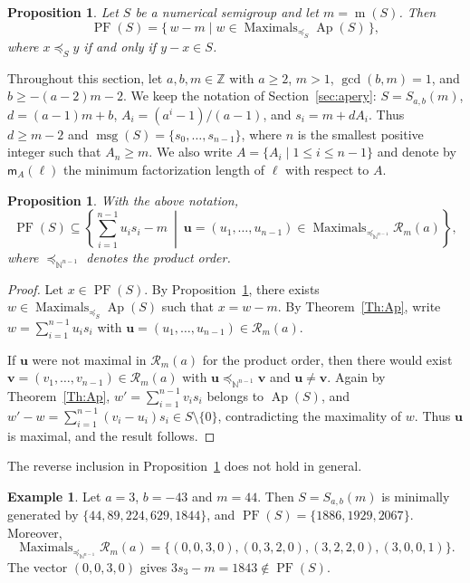\documentclass[12pt,a4paper]{amsart}
\newtheorem{proposition}[theorem]{Proposition}
\theoremstyle{definition}
\newtheorem{example}[theorem]{Example}
\begin{document}
\begin{proposition}\label{prop:PF1}
Let $S$ be a numerical semigroup and let $m=\operatorname{m}(S)$. Then
\[
\operatorname{PF}(S)=
\{\,w-m \mid w\in \operatorname{Maximals}_{\preceq_S}\operatorname{Ap}(S)\,\},
\]
where $x\preceq_S y$ if and only if $y-x\in S$.
\end{proposition}

Throughout this section, let $a,b,m\in\mathbb{Z}$ with $a\ge 2$,
$m>1$, $\gcd(b,m)=1$, and $b\ge -(a-2)m-2$. We keep the notation of
Section~\ref{sec:apery}: $S=S_{a,b}(m)$,
$d=(a-1)m+b$, $A_i=(a^i-1)/(a-1)$, and $s_i=m+dA_i$. Thus
$d\ge m-2$ and
$\operatorname{msg}(S)=\{s_0,\ldots,s_{n-1}\}$, where $n$ is the
smallest positive integer such that $A_n\ge m$. We also write
$A=\{A_i\mid 1\le i\le n-1\}$ and denote by $\mathsf{m}_A(\ell)$ the
minimum factorization length of $\ell$ with respect to $A$.

\begin{proposition}\label{prop:PF2}
With the above notation,
\[
\operatorname{PF}(S) \subseteq
\left\{\sum_{i=1}^{n-1} u_i s_i - m\ \middle|\ 
\mathbf{u}=(u_1,\ldots,u_{n-1}) \in
\operatorname{Maximals}_{\preceq_{\mathbb{N}^{n-1}}}\mathcal{R}_m(a)
\right\},
\]
where $\preceq_{\mathbb{N}^{n-1}}$ denotes the product order.
\end{proposition}

\begin{proof}
Let $x\in\operatorname{PF}(S)$. By Proposition~\ref{prop:PF1}, there
exists $w\in \operatorname{Maximals}_{\preceq_S}\operatorname{Ap}(S)$
such that $x=w-m$. By Theorem~\ref{Th:Ap}, write
$w=\sum_{i=1}^{n-1}u_i s_i$ with
$\mathbf{u}=(u_1,\ldots,u_{n-1})\in\mathcal{R}_m(a)$.

If $\mathbf{u}$ were not maximal in $\mathcal{R}_m(a)$ for the product
order, then there would exist
$\mathbf{v}=(v_1,\ldots,v_{n-1})\in\mathcal{R}_m(a)$ with
$\mathbf{u}\preceq_{\mathbb{N}^{n-1}}\mathbf{v}$ and
$\mathbf{u}\ne\mathbf{v}$. Again by
Theorem~\ref{Th:Ap}, $w'=\sum_{i=1}^{n-1}v_i s_i$ belongs to
$\operatorname{Ap}(S)$, and
$w'-w=\sum_{i=1}^{n-1}(v_i-u_i)s_i\in S\setminus\{0\}$, contradicting
the maximality of $w$. Thus $\mathbf{u}$ is maximal, and the result
follows.
\end{proof}

The reverse inclusion in Proposition~\ref{prop:PF2} does not hold in general.

\begin{example}
Let $a=3$, $b=-43$ and $m=44$. Then $S=S_{a,b}(m)$ is minimally generated by
$\{44,89,224,629,1844\}$, and
$\operatorname{PF}(S)=\{1886,1929,2067\}$. Moreover,
\[
\operatorname{Maximals}_{\preceq_{\mathbb{N}^{n-1}}}\mathcal{R}_m(a) = 
\{(0,0,3,0), (0,3,2,0), (3,2,2,0), (3,0,0,1)\}.
\]
The vector $(0,0,3,0)$ gives $3s_3-m=1843\notin \operatorname{PF}(S)$.
\end{example}
\end{document}
